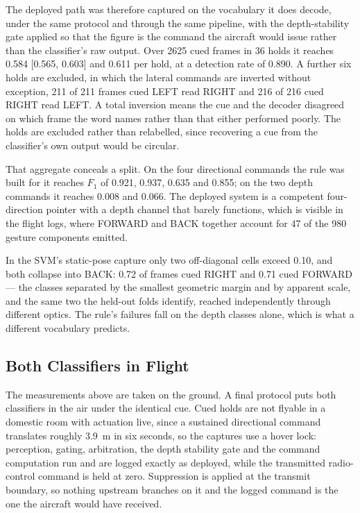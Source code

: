 \documentclass[conference]{IEEEtran}
\begin{document}
The deployed path was therefore captured on the vocabulary it does decode, under
the same protocol and through the same pipeline, with the depth-stability gate
applied so that the figure is the command the aircraft would issue rather than
the classifier's raw output. Over 2625 cued frames in 36 holds it reaches 0.584
[0.565, 0.603] and 0.611 per hold, at a detection rate of 0.890. A further six holds are excluded, in which
the lateral commands are inverted without exception, 211 of 211 frames cued LEFT
read RIGHT and 216 of 216 cued RIGHT read LEFT. A total inversion means the cue
and the decoder disagreed on which frame the word names rather than that either
performed poorly. The holds are excluded rather than relabelled, since
recovering a cue from the classifier's own output would be circular.

That aggregate conceals a split. On the four directional commands the rule was
built for it reaches $F_1$ of 0.921, 0.937, 0.635 and 0.855; on the two depth
commands it reaches 0.008 and 0.066. The deployed system is a competent
four-direction pointer with a depth channel that barely functions, which is
visible in the flight logs, where FORWARD and BACK together account for 47 of the
980 gesture components emitted.

In the SVM's static-pose capture only two off-diagonal cells exceed 0.10, and
both collapse into BACK: 0.72 of frames cued RIGHT and 0.71 cued FORWARD --- the
classes separated by the smallest geometric margin and by apparent scale, and
the same two the held-out folds identify, reached independently through
different optics. The rule's failures fall on the depth classes alone, which is
what a different vocabulary predicts.

\subsection{Both Classifiers in Flight}
\label{sec:inflight}



The measurements above are taken on the ground. A final protocol puts both
classifiers in the air under the identical cue. Cued holds are not flyable in a
domestic room with actuation live, since a sustained directional command
translates roughly 3.9~m in six seconds, so the captures use a hover lock:
perception, gating, arbitration, the depth stability gate and the command
computation run and are logged exactly as deployed, while the transmitted
radio-control command is held at zero. Suppression is applied at the transmit
boundary, so nothing upstream branches on it and the logged command is the one
the aircraft would have received.
\end{document}
